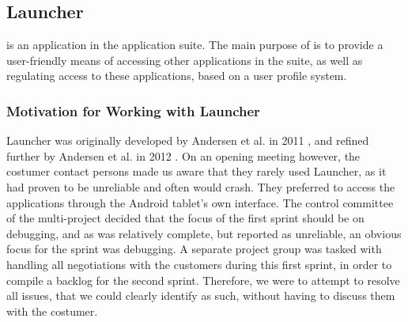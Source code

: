 \subsection{Launcher}\label{sec:launcher}
\launcher is an application in the \giraf application suite.
The main purpose of \launcher is to provide a user-friendly means of accessing other applications in the \giraf suite, as well as regulating access to these applications, based on a user profile system.

\subsubsection{Motivation for Working with Launcher}
Launcher was originally developed by Andersen et al. in 2011 \cite{launcher2011}, and refined further by Andersen et al. in 2012 \cite{launcher2012}.
On an opening meeting however, the costumer contact persons made us aware that they rarely used Launcher, as it had proven to be unreliable and often would crash. 
They preferred to access the \giraf applications through the Android tablet's own interface.
The control committee of the multi-project decided that the focus of the first sprint should be on debugging, and as \launcher was relatively complete, but reported as unreliable, an obvious focus for the sprint was debugging. 
A separate project group was tasked with handling all negotiations with the customers during this first sprint, in order to compile a backlog for the second sprint.
Therefore, we were to attempt to resolve all issues, that we could clearly identify as such, without having to discuss them with the costumer.

